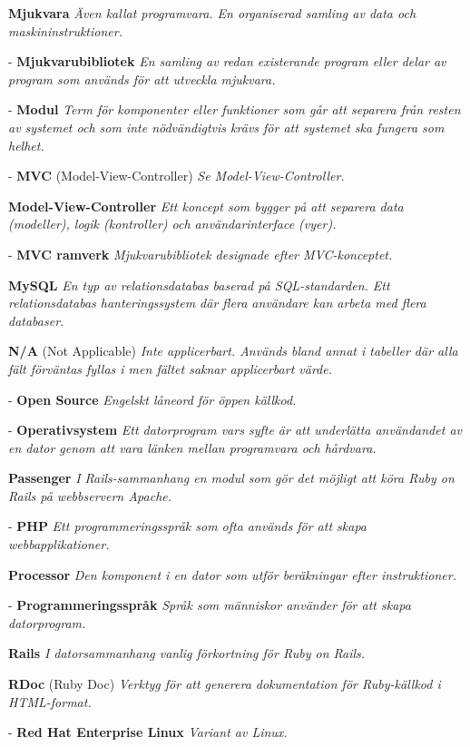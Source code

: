 \documentclass[a4paper, twoside, 11pt, titlepage]{article}
\begin{document}
	\textbf{Mjukvara} \emph{Även kallat programvara. En organiserad samling av data och maskininstruktioner.}

	- \textbf{Mjukvarubibliotek} \emph{En samling av redan existerande program eller delar av program som används för att utveckla mjukvara.}

	- \textbf{Modul} \emph{Term för komponenter eller funktioner som går att separera från resten av systemet och som inte nödvändigtvis krävs för att systemet ska fungera som helhet.}

	- \textbf{MVC} (Model-View-Controller) \emph{Se Model-View-Controller.}

	\textbf{Model-View-Controller} \emph{Ett koncept som bygger på att separera data (modeller), logik (kontroller) och användarinterface (vyer).}

	- \textbf{MVC ramverk} \emph{Mjukvarubibliotek designade efter MVC-konceptet.}

	\textbf{MySQL} \emph{En typ av relationsdatabas baserad på SQL-standarden. Ett relationsdatabas hanteringssystem där flera användare kan arbeta med flera databaser.}

	\textbf{N/A} (Not Applicable) \emph{Inte applicerbart. Används bland annat i tabeller där alla fält förväntas fyllas i men fältet saknar applicerbart värde.}

	- \textbf{Open Source} \emph{Engelskt låneord för öppen källkod.}

	- \textbf{Operativsystem} \emph{Ett datorprogram vars syfte är att underlätta användandet av en dator genom att vara länken mellan programvara och hårdvara.}

	\textbf{Passenger} \emph{I Rails-sammanhang en modul som gör det möjligt att köra Ruby on Rails på webbservern Apache.}

	- \textbf{PHP} \emph{Ett programmeringsspråk som ofta används för att skapa webbapplikationer.}

	\textbf{Processor} \emph{Den komponent i en dator som utför beräkningar efter instruktioner.}

	- \textbf{Programmeringsspråk} \emph{Språk som människor använder för att skapa datorprogram.}

	\textbf{Rails} \emph{I datorsammanhang vanlig förkortning för Ruby on Rails.}

	\textbf{RDoc} (Ruby Doc) \emph{Verktyg för att generera dokumentation för Ruby-källkod i HTML-format.}

	- \textbf{Red Hat Enterprise Linux} \emph{Variant av Linux.}
\end{document}
